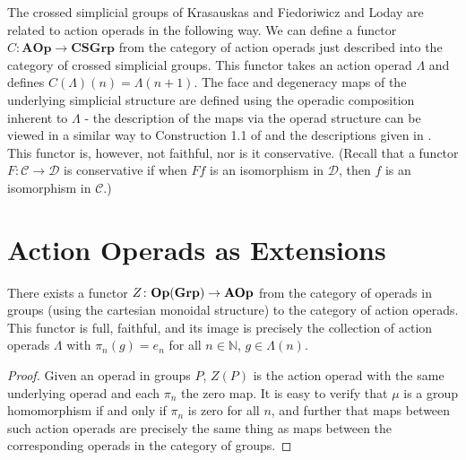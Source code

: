 \begin{rem}\label{rem:crossed}
The crossed simplicial groups of Krasauskas \cite{Kra87} and Fiedoriwicz and Loday \cite{FL91} are related to action operads in the following way. We can define a functor $C \colon \mathbf{AOp} \rightarrow \mathbf{CSGrp}$ from the category of action operads just described into the category of crossed simplicial groups. This functor takes an action operad $\Lambda$ and defines $C(\Lambda)(n) = \Lambda(n+1)$. The face and degeneracy maps of the underlying simplicial structure are defined using the operadic composition inherent to $\Lambda$ - the description of the maps via the operad structure can be viewed in a similar way to Construction 1.1 of \cite{Kra96} and the descriptions given in \cite{ber-simplicial}. This functor is, however, not faithful, nor is it conservative. (Recall that a functor $F \colon \mathcal{C} \rightarrow \mathcal{D}$ is conservative if when $Ff$ is an isomorphism in $\mathcal{D}$, then $f$ is an isomorphism in $\mathcal{C}$.)
\end{rem}




\section{Action Operads as Extensions}


\begin{prop}\label{Z}
There exists a functor $Z \colon  \mathbf{Op}(\mathbf{Grp}) \rightarrow \mathbf{AOp}$ from the category of operads in groups (using the cartesian monoidal structure) to the category of action operads. This functor is full, faithful, and its image is precisely the collection of action operads $\Lambda$ with $\pi_{n}(g) = e_{n}$ for all $n \in \mathbb{N}$, $g \in \Lambda(n)$.
\end{prop}
\begin{proof}
Given an operad in groups $P$, $Z(P)$ is the action operad with the same underlying operad and each $\pi_{n}$ the zero map. It is easy to verify that $\mu$ is a group homomorphism if and only if $\pi_{n}$ is zero for all $n$, and further that maps between such action operads are precisely the same thing as maps between the corresponding operads in the category of groups.
\end{proof}

